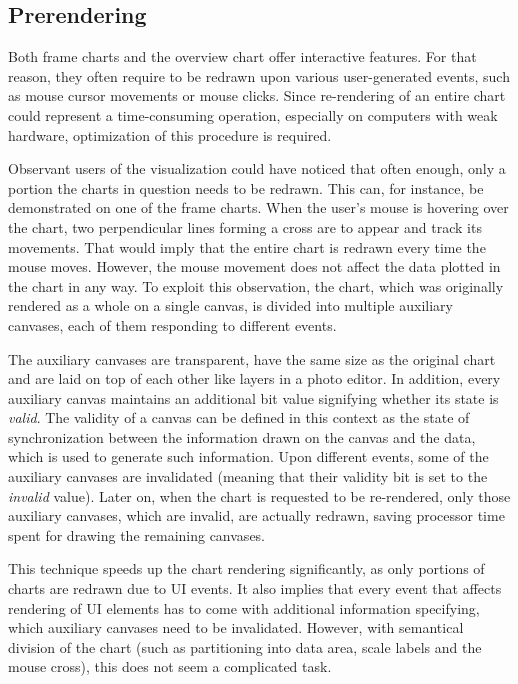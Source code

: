 \subsection{Prerendering}
Both frame charts and the overview chart offer interactive features. For that reason, they often require to be redrawn upon various user-generated events, such as mouse cursor movements or mouse clicks. Since re-rendering of an entire chart could represent a time-consuming operation, especially on computers with weak hardware, optimization of this procedure is required.

Observant users of the visualization could have noticed that often enough, only a portion the charts in question needs to be redrawn. This can, for instance, be demonstrated on one of the frame charts. When the user's mouse is hovering over the chart, two perpendicular lines forming a cross are to appear and track its movements. That would imply that the entire chart is redrawn every time the mouse moves. However, the mouse movement does not affect the data plotted in the chart in any way. To exploit this observation, the chart, which was originally rendered as a whole on a single canvas, is divided into multiple auxiliary canvases, each of them responding to different events.

The auxiliary canvases are transparent, have the same size as the original chart and are laid on top of each other like layers in a photo editor. In addition, every auxiliary canvas maintains an additional bit value signifying whether its state is \textit{valid}. The validity of a canvas can be defined in this context as the state of synchronization between the information drawn on the canvas and the data, which is used to generate such information. Upon different events, some of the auxiliary canvases are invalidated (meaning that their validity bit is set to the \textit{invalid} value). Later on, when the chart is requested to be re-rendered, only those auxiliary canvases, which are invalid, are actually redrawn, saving processor time spent for drawing the remaining canvases.

This technique speeds up the chart rendering significantly, as only portions of charts are redrawn due to UI events. It also implies that every event that affects rendering of UI elements has to come with additional information specifying, which auxiliary canvases need to be invalidated. However, with semantical division of the chart (such as partitioning into data area, scale labels and the mouse cross), this does not seem a complicated task.

